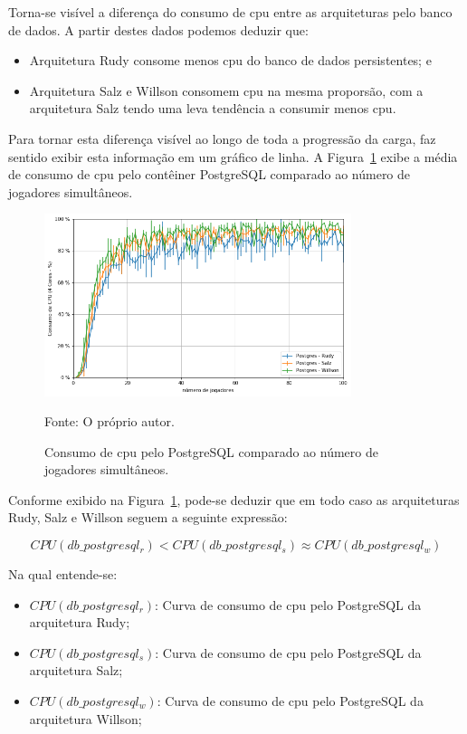 Torna-se visível a diferença do consumo de \ac{cpu} entre as arquiteturas pelo banco de dados.
%
A partir destes dados podemos deduzir que:

\begin{itemize}
 \item Arquitetura Rudy consome menos \ac{cpu} do banco de dados persistentes; e \item Arquitetura Salz e Willson consomem \ac{cpu} na mesma proporsão, com a arquitetura Salz tendo uma leva tendência a consumir menos \ac{cpu}.
\end{itemize}

Para tornar esta diferença visível ao longo de toda a progressão da carga, faz sentido exibir esta informação em um gráfico de linha.
%
A Figura~\ref{fig:cpu_db_media_por_jogador} exibe a média de consumo de \ac{cpu} pelo contêiner PostgreSQL comparado ao número de jogadores simultâneos.

\begin{figure}[htb!]
  \caption{Consumo de \ac{cpu} pelo PostgreSQL comparado ao número de jogadores simultâneos.}
  \label{fig:cpu_db_media_por_jogador}
  \includegraphics[width=0.8\textwidth]{figuras/analise/cpu_db_media_por_jogador.png}
  \centering

  Fonte: O próprio autor.
\end{figure}

Conforme exibido na Figura~\ref{fig:cpu_db_media_por_jogador}, pode-se deduzir que em todo caso as arquiteturas Rudy, Salz e Willson seguem a seguinte expressão:

$$
    CPU(db\_postgresql_{r}) < CPU(db\_postgresql_{s}) \approx CPU(db\_postgresql_{w})
$$

Na qual entende-se:

\begin{itemize}
\item $CPU(db\_postgresql_{r})$: Curva de consumo de \ac{cpu} pelo PostgreSQL da arquitetura Rudy;
\item $CPU(db\_postgresql_{s})$: Curva de consumo de \ac{cpu} pelo PostgreSQL da arquitetura Salz;
\item $CPU(db\_postgresql_{w})$: Curva de consumo de \ac{cpu} pelo PostgreSQL da arquitetura Willson;
\end{itemize}

